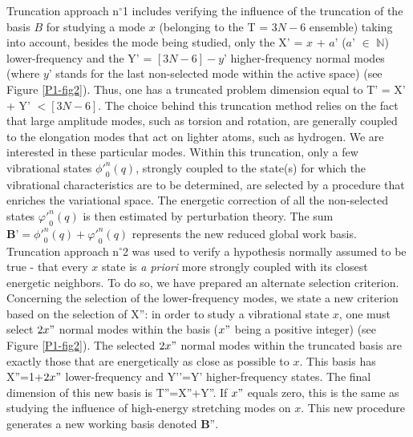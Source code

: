 	Truncation approach n$^{\circ}$1 includes verifying the influence of the truncation of the basis $B$ for studying a mode $x$ (belonging to the T = $3N-6$ ensemble) taking into account, besides the mode being studied, only the X’ = $x$ + $a’$ ($a’$ $\in$ $\mathbb {N}$) lower-frequency and the Y’ = $[3N-6]-y’$ higher-frequency normal modes (where $y’$ stands for the last non-selected mode within the active space) (see Figure \ref{P1-fig2}). Thus, one has a truncated problem dimension equal to T’ = X’ + Y’ $< [3N-6]$. The choice behind this truncation method relies on the fact that large amplitude modes, such as torsion and rotation, are generally coupled to the elongation modes that act on lighter atoms, such as hydrogen. We are interested in these particular modes. Within this truncation, only a few vibrational states ${\phi'}_{0}^{n} (q)$, strongly coupled to the state(s) for which the vibrational characteristics are to be determined, are selected by a procedure that enriches the variational space. The energetic correction of all the non-selected states ${\varphi'}_{0}^{n} (q)$ is then estimated by perturbation theory. The sum $\textbf{B’} = {\phi'}_{0}^{n} (q) + {\varphi'}_{0}^{n} (q)$ represents the new reduced global work basis.\\
	
	Truncation approach n$^{\circ}$2 was used to verify a hypothesis normally assumed to be true - that every $x$ state is \textit{a priori} more strongly coupled with its closest energetic neighbors. To do so, we have prepared an alternate selection criterion. Concerning the selection of the lower-frequency modes, we state a new criterion based on the selection of X'': in order to study a vibrational state $x$, one must select $2x"$ normal modes within the basis ($x"$ being a positive integer) (see Figure \ref{P1-fig2}). The selected $2x"$ normal modes within the truncated basis are exactly those that are energetically as close as possible to $x$. This basis has X''=1+$2x"$ lower-frequency and Y’’=Y’ higher-frequency states. The final dimension of this new basis is T''=X''+Y''. If $x"$ equals zero, this is the same as studying the influence of high-energy stretching modes on $x$. This new procedure generates a new working basis denoted $\textbf{B''}$.
	
